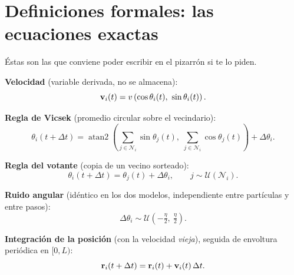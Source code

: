 \documentclass[11pt]{article}
\begin{document}

\section{Definiciones formales: las ecuaciones exactas}
\label{sec:ecuaciones}

Éstas son las que conviene poder escribir en el pizarrón si te lo piden.

\textbf{Velocidad} (variable derivada, no se almacena):
\begin{equation}
  \vect{v}_i(t) = v\left(\cos\theta_i(t),\ \sin\theta_i(t)\right).
  \label{eq:vel}
\end{equation}

\textbf{Regla de Vicsek} (promedio circular sobre el vecindario):
\begin{equation}
  \theta_i(t+\Delta t) = \operatorname{atan2}\!\left(
    \sum_{j \in \mathcal{N}_i} \sin\theta_j(t),\;
    \sum_{j \in \mathcal{N}_i} \cos\theta_j(t)\right) + \Delta\theta_i .
  \label{eq:vicsek}
\end{equation}

\textbf{Regla del votante} (copia de un vecino sorteado):
\begin{equation}
  \theta_i(t+\Delta t) = \theta_j(t) + \Delta\theta_i,
  \qquad j \sim \mathcal{U}(\mathcal{N}_i).
  \label{eq:votante}
\end{equation}

\textbf{Ruido angular} (idéntico en los dos modelos, independiente entre
partículas y entre pasos):
\begin{equation}
  \Delta\theta_i \sim \mathcal{U}\!\left(-\tfrac{\eta}{2},\ \tfrac{\eta}{2}\right).
  \label{eq:ruido}
\end{equation}

\textbf{Integración de la posición} (con la velocidad \emph{vieja}), seguida de
envoltura periódica en $[0, L)$:
\begin{equation}
  \mathbf{r}_i(t+\Delta t) = \mathbf{r}_i(t) + \mathbf{v}_i(t)\,\Delta t .
  \label{eq:pos}
\end{equation}
\end{document}
